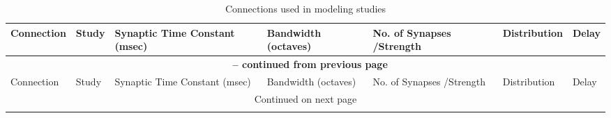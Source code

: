 \begin{longtable}{XXXXXXX}%
%
\caption{ Connections  used in modeling studies} \\
\toprule  
 Connection &    Study &    Synaptic Time Constant (msec) &    Bandwidth (octaves) &    No. of Synapses /Strength &    Distribution &    Delay\\ \midrule 
\endfirsthead

\multicolumn{7}{c}{{\bfseries \tablename\ \thetable{} -- continued from previous page}} \\
\midrule  Connection &    Study &    Synaptic Time Constant (msec) &    Bandwidth (octaves) &    No. of Synapses /Strength &    Distribution &    Delay\\ \midrule 
\endhead

\midrule \multicolumn{7}{c}{{Continued on next page}} \\ %
\endfoot
\bottomrule
\endlastfoot


\end{longtable}
